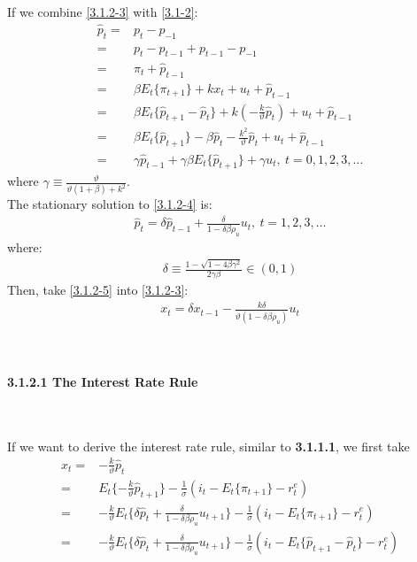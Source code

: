 \documentclass{article}
\numberwithin{equation}{section}
\begin{document}
If we combine \eqref{3.1.2-3} with \eqref{3.1-2}:
	\begin{align}
		\hat{p}_t = &p_t - p_{-1} \nonumber\\
		= &p_t - p_{t-1} + p_{t-1} - p_{-1} \nonumber\\
		= &\pi_t + \hat{p}_{t-1} \nonumber\\
		= &\beta E_t\{ \pi_{t+1} \} + kx_t + u_t + \hat{p}_{t-1} \nonumber\\
		= &\beta E_t\{ \hat{p}_{t+1} - \hat{p}_t \} + k \left( -\frac{k}{\vartheta}\hat{p}_t \right) + u_t + \hat{p}_{t-1} \nonumber\\
		= &\beta E_t\{ \hat{p}_{t+1} \} - \beta \hat{p}_t - \frac{k^2}{\vartheta}\hat{p}_t + u_t + \hat{p}_{t-1}\nonumber\\
		= &\gamma \hat{p}_{t-1} + \gamma \beta E_t\{ \hat{p}_{t+1} \} + \gamma u_t,\ t = 0, 1, 2, 3, \ldots \label{3.1.2-4}
	\end{align}
where $\gamma \equiv \frac{\vartheta}{\vartheta(1 + \beta) + k^2}$.\\
The stationary solution to \eqref{3.1.2-4} is:
	\begin{align}
		\hat{p}_t = \delta \hat{p}_{t-1} + \frac{\delta}{1 - \delta\beta\rho_u}u_t,\ t = 1, 2, 3, \ldots \label{3.1.2-5}
	\end{align}
where:
	\begin{align*}
		\delta \equiv \frac{1 - \sqrt{1 - 4\beta\gamma^2}}{2\gamma \beta} \in (0, 1)
	\end{align*}
Then, take \eqref{3.1.2-5} into \eqref{3.1.2-3}:
	\begin{align}
		x_t = \delta x_{t-1} - \frac{k\delta}{\vartheta(1 - \delta\beta\rho_u)}u_t \label{3.1.2-6}
	\end{align}\\\\
\centerline{\textbf{3.1.2.1 The Interest Rate Rule}}\\\\
If we want to derive the interest rate rule, similar to \textbf{3.1.1.1}, we first take 
	\begin{align}
		x_t = &-\frac{k}{\vartheta}\hat{p}_t \nonumber\\
		= &E_t\{ -\frac{k}{\vartheta}\hat{p}_{t+1} \} - \frac{1}{\sigma}(i_t - E_t\{ \pi_{t+1} \} - r^e_t) \nonumber\\
		= &-\frac{k}{\vartheta}E_t\{ \delta \hat{p}_{t} + \frac{\delta}{1 - \delta\beta\rho_u}u_{t+1} \} - \frac{1}{\sigma}(i_t - E_t\{ \pi_{t+1} \} - r^e_t) \nonumber\\
		= &-\frac{k}{\vartheta}E_t\{ \delta \hat{p}_{t} + \frac{\delta}{1 - \delta\beta\rho_u}u_{t+1} \} - \frac{1}{\sigma}(i_t - E_t\{ \hat{p}_{t+1} - \hat{p}_t \} - r^e_t) \label{3.1.2.1-1}
	\end{align}
\end{document}
